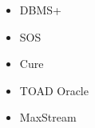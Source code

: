 \begin{itemize}
\item{DBMS+}
\item{SOS}
\item{Cure}
\item{TOAD Oracle}
\item{MaxStream}
\end{itemize}